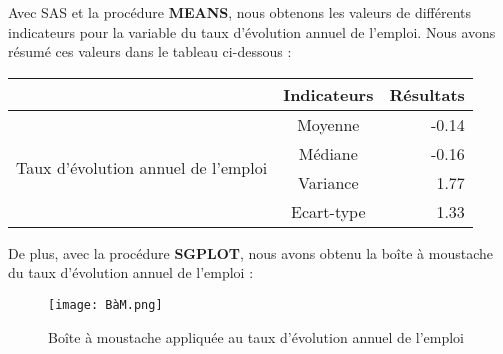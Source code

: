 \documentclass{article}
\begin{document}
\medbreak

Avec SAS et la procédure \textbf{MEANS}, nous obtenons les valeurs de différents indicateurs pour la variable du taux d'évolution annuel de l'emploi. Nous avons résumé ces valeurs dans le tableau ci-dessous : 

\bigbreak

\begin{center}
    
\begin{tabular}{|c|c|r|}
    \hline
     & Indicateurs & Résultats \\
     \hline
     \multirow{4}{*}{Taux d'évolution annuel de l'emploi} & Moyenne & -0.14\\
     & Médiane & -0.16 \\
     & Variance & 1.77 \\
     & Ecart-type & 1.33 \\
     \hline
\end{tabular}

\end{center}

\bigbreak

De plus, avec la procédure \textbf{SGPLOT}, nous avons obtenu la boîte à moustache du taux d'évolution annuel de l'emploi : 

\begin{figure}[h]
    \centering
    \texttt{[image: BàM.png]}
    \caption{Boîte à moustache appliquée au taux d'évolution annuel de l'emploi}
    \label{fig:my_label}
\end{figure}
\end{document}

